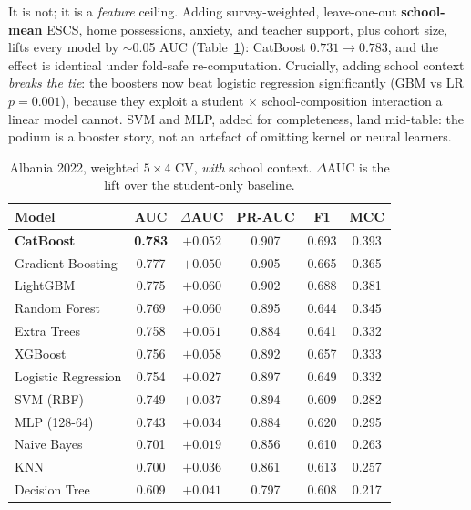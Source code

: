 It is not; it is a \emph{feature} ceiling. Adding survey-weighted, leave-one-out
\textbf{school-mean} ESCS, home possessions, anxiety, and teacher support, plus cohort size,
lifts every model by $\sim$0.05 AUC (Table~\ref{tab:models}): CatBoost
$0.731\rightarrow\mathbf{0.783}$, and the effect is identical under fold-safe
re-computation. Crucially, adding school context \emph{breaks the tie}: the boosters
now beat logistic regression significantly (GBM vs LR $p=0.001$), because they exploit
a student $\times$ school-composition interaction a linear model cannot. SVM and MLP,
added for completeness, land mid-table: the podium is a booster story, not an
artefact of omitting kernel or neural learners.

\begin{table}[t]
\centering
\caption[Model comparison with school context, Albania 2022]{Albania 2022, weighted $5\times4$ CV, \emph{with} school context.
$\Delta$AUC is the lift over the student-only baseline.}
\label{tab:models}
\begin{tabular}{lccccc}
\toprule
Model & AUC & $\Delta$AUC & PR-AUC & F1 & MCC \\
\midrule
\textbf{CatBoost}   & \textbf{0.783} & $+0.052$ & 0.907 & 0.693 & 0.393 \\
Gradient Boosting   & 0.777 & $+0.050$ & 0.905 & 0.665 & 0.365 \\
LightGBM            & 0.775 & $+0.060$ & 0.902 & 0.688 & 0.381 \\
Random Forest       & 0.769 & $+0.060$ & 0.895 & 0.644 & 0.345 \\
Extra Trees         & 0.758 & $+0.051$ & 0.884 & 0.641 & 0.332 \\
XGBoost             & 0.756 & $+0.058$ & 0.892 & 0.657 & 0.333 \\
Logistic Regression & 0.754 & $+0.027$ & 0.897 & 0.649 & 0.332 \\
SVM (RBF)           & 0.749 & $+0.037$ & 0.894 & 0.609 & 0.282 \\
MLP (128-64)        & 0.743 & $+0.034$ & 0.884 & 0.620 & 0.295 \\
Naive Bayes         & 0.701 & $+0.019$ & 0.856 & 0.610 & 0.263 \\
KNN                 & 0.700 & $+0.036$ & 0.861 & 0.613 & 0.257 \\
Decision Tree       & 0.609 & $+0.041$ & 0.797 & 0.608 & 0.217 \\
\bottomrule
\end{tabular}
\end{table}

